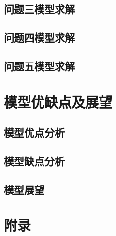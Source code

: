 \documentclass{article}
\begin{document}
\subsection{问题三模型求解}

\subsection{问题四模型求解}

\subsection{问题五模型求解}

\section{模型优缺点及展望}

\subsection{模型优点分析}

\subsection{模型缺点分析}

\subsection{模型展望}




\section*{附录}
\vspace{-1em}


\noindent
\end{document}

